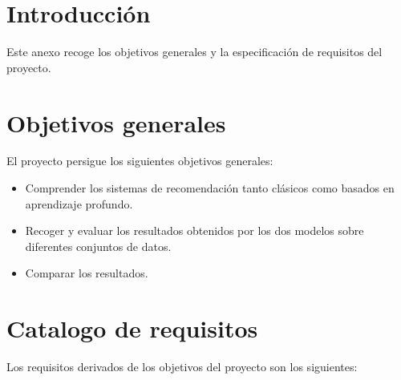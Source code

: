 
\section{Introducción}
Este anexo recoge los objetivos generales y la especificación de requisitos del proyecto.

\section{Objetivos generales}
El proyecto persigue los siguientes objetivos generales:
\begin{itemize}
\tightlist
\item Comprender los sistemas de recomendación tanto clásicos como basados en aprendizaje profundo.
\item Recoger y evaluar los resultados obtenidos por los dos modelos sobre diferentes conjuntos de datos.
\item Comparar los resultados.
\end{itemize}

\section{Catalogo de requisitos}
Los requisitos derivados de los objetivos del proyecto son los siguientes:
